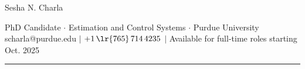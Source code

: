 \documentclass[letterpaper, 10pt]{article}
\begin{document}
\begin{center}
        \huge
        Sesha N. Charla
\end{center}
\begin{center}
        PhD Candidate $\cdot$
        Estimation and Control Systems $\cdot$
        Purdue University \\
        scharla@purdue.edu $|$
        $+1\,\lr{765}\, 714 \, 4235$ $|$
        Available for full-time roles starting Oct. 2025
\end{center}

\noindent\rule{\textwidth}{0.4pt}






% 
\end{document}
